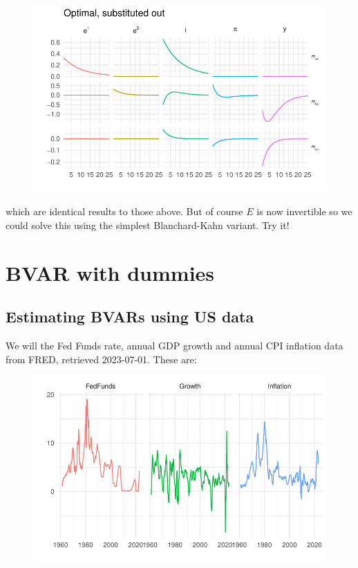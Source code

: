 \documentclass[
  letterpaper,
]{book}
\begin{document}
\begin{figure}[H]

{\centering \includegraphics{BK_files/figure-pdf/unnamed-chunk-32-1.pdf}

}

\end{figure}

which are identical results to those above. But of course \(E\) is now
invertible so we could solve this using the simplest
Blanchard-Kahn variant. Try it!

\hypertarget{bvar-with-dummies}{%
\chapter{BVAR with dummies}\label{bvar-with-dummies}}

\hypertarget{estimating-bvars-using-us-data}{%
\section{Estimating BVARs using US
data}\label{estimating-bvars-using-us-data}}

We will the Fed Funds rate, annual GDP growth and annual CPI inflation
data from FRED, retrieved 2023-07-01. These are:

\begin{figure}

{\centering \includegraphics{BVAR_files/figure-pdf/unnamed-chunk-2-1.pdf}

}

\end{figure}
\end{document}
